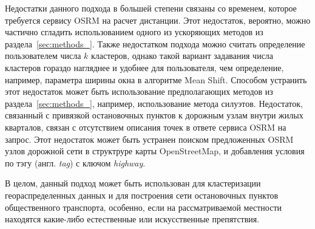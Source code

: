 Недостатки данного подхода в большей степени связаны со временем, которое требуется сервису OSRM на расчет дистанции. Этот недостаток, вероятно, можно частично сгладить использованием одного из ускоряющих методов из раздела~\ref{sec:methods_}. Также недостатком подхода можно считать определение пользователем числа \( k \) кластеров, однако такой вариант задавания числа кластеров гораздо нагляднее и удобнее для пользователя, чем определение, например, параметра ширины окна в алгоритме Mean Shift. Способом устранить этот недостаток может быть использование предполагающих методов из раздела~\ref{sec:methods_}, например, использование метода силуэтов. Недостаток, связанный с привязкой остановочных пунктов к дорожным узлам внутри жилых кварталов, связан с отсутствием описания точек в ответе сервиса OSRM на запрос. Этот недостаток может быть устранен поиском предложенных OSRM узлов дорожной сети в структруре карты OpenStreetMap, и добавления условия по тэгу (англ. \emph{tag}) с ключом \emph{highway}.

В целом, данный подход может быть использован для кластеризации геораспределенных данных и для построения сети остановочных пунктов общественного транспорта, особенно, если на рассматриваемой местности находятся какие-либо естественные или искусственные препятствия.
